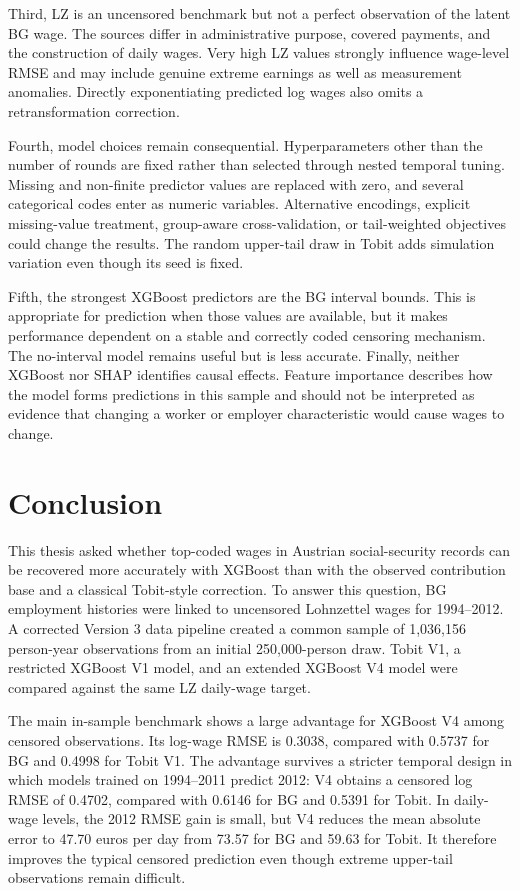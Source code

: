 \documentclass[12pt,a4paper,oneside,titlepage]{book}
\begin{document}
Third, LZ is an uncensored benchmark but not a perfect observation of the latent BG wage. The sources differ in administrative purpose, covered payments, and the construction of daily wages. Very high LZ values strongly influence wage-level RMSE and may include genuine extreme earnings as well as measurement anomalies. Directly exponentiating predicted log wages also omits a retransformation correction.

Fourth, model choices remain consequential. Hyperparameters other than the number of rounds are fixed rather than selected through nested temporal tuning. Missing and non-finite predictor values are replaced with zero, and several categorical codes enter as numeric variables. Alternative encodings, explicit missing-value treatment, group-aware cross-validation, or tail-weighted objectives could change the results. The random upper-tail draw in Tobit adds simulation variation even though its seed is fixed.

Fifth, the strongest XGBoost predictors are the BG interval bounds. This is appropriate for prediction when those values are available, but it makes performance dependent on a stable and correctly coded censoring mechanism. The no-interval model remains useful but is less accurate. Finally, neither XGBoost nor SHAP identifies causal effects. Feature importance describes how the model forms predictions in this sample and should not be interpreted as evidence that changing a worker or employer characteristic would cause wages to change.

\chapter{Conclusion}
\label{ch:conclusion}
This thesis asked whether top-coded wages in Austrian social-security records can be recovered more accurately with XGBoost than with the observed contribution base and a classical Tobit-style correction. To answer this question, BG employment histories were linked to uncensored Lohnzettel wages for 1994--2012. A corrected Version 3 data pipeline created a common sample of 1,036,156 person-year observations from an initial 250,000-person draw. Tobit V1, a restricted XGBoost V1 model, and an extended XGBoost V4 model were compared against the same LZ daily-wage target.

The main in-sample benchmark shows a large advantage for XGBoost V4 among censored observations. Its log-wage RMSE is 0.3038, compared with 0.5737 for BG and 0.4998 for Tobit V1. The advantage survives a stricter temporal design in which models trained on 1994--2011 predict 2012: V4 obtains a censored log RMSE of 0.4702, compared with 0.6146 for BG and 0.5391 for Tobit. In daily-wage levels, the 2012 RMSE gain is small, but V4 reduces the mean absolute error to 47.70 euros per day from 73.57 for BG and 59.63 for Tobit. It therefore improves the typical censored prediction even though extreme upper-tail observations remain difficult.
\end{document}
